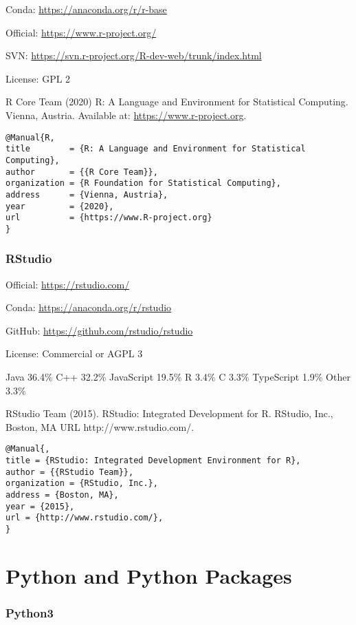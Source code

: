 \documentclass[]{article}
\begin{document}
Conda: \url{https://anaconda.org/r/r-base}

Official: \url{https://www.r-project.org/}

SVN: \url{https://svn.r-project.org/R-dev-web/trunk/index.html}

License: GPL 2

R Core Team (2020) R: A Language and Environment for Statistical Computing. Vienna, Austria. Available at: \url{https://www.r-project.org}.

\begin{verbatim}
@Manual{R,
title        = {R: A Language and Environment for Statistical
Computing},
author       = {{R Core Team}},
organization = {R Foundation for Statistical Computing},
address      = {Vienna, Austria},
year         = {2020},
url          = {https://www.R-project.org}
}
\end{verbatim}

\section{RStudio}

Official: \url{https://rstudio.com/}

Conda: \url{https://anaconda.org/r/rstudio}

GitHub: \url{https://github.com/rstudio/rstudio}

License: Commercial or AGPL 3

Java 36.4\% C++ 32.2\% JavaScript 19.5\% R 3.4\% C 3.3\% TypeScript 1.9\% Other 3.3\% 

RStudio Team (2015). RStudio: Integrated Development for R. RStudio, Inc., Boston, MA URL http://www.rstudio.com/.

\begin{verbatim}
@Manual{,
title = {RStudio: Integrated Development Environment for R},
author = {{RStudio Team}},
organization = {RStudio, Inc.},
address = {Boston, MA},
year = {2015},
url = {http://www.rstudio.com/},
}
\end{verbatim}




\part{Python and Python Packages}

\section{Python3}
\end{document}
